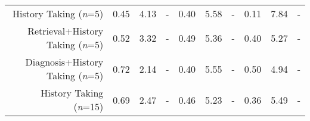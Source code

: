 \begin{table*}[ht]
\begin{tabular}{rccccccccc}
History Taking (\textit{n}=5)         & 0.45           & 4.13     & - & 0.40        & 5.58     &    -  & 0.11         & 7.84     &  -    \\
Retrieval+History Taking (\textit{n}=5)  &      0.52      & 3.32   &  -  &  0.49  &  5.36       & -  &     0.40   &   5.27 &    -   \\
Diagnosis+History Taking (\textit{n}=5)  &    0.72       &  2.14 &  -  &  0.40 &    5.55   & -  &   0.50    &   4.94 &    -   \\
History Taking (\textit{n}=15)        & 0.69           & 2.47     & - & 0.46        & 5.23      &  -   & 0.36         & 5.49      &    - \\\cmidrule(lr){2-10}


\end{tabular}
\end{table*}
